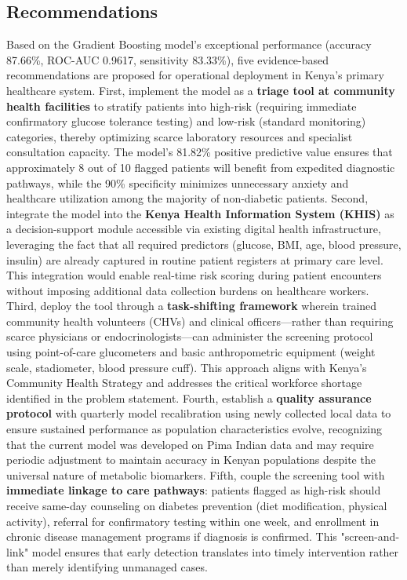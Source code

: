 \documentclass[12pt]{article}
\begin{document}
\subsection{Recommendations}

Based on the Gradient Boosting model's exceptional performance (accuracy 87.66\%, ROC-AUC 0.9617, sensitivity 83.33\%), five evidence-based recommendations are proposed for operational deployment in Kenya's primary healthcare system. First, implement the model as a \textbf{triage tool at community health facilities} to stratify patients into high-risk (requiring immediate confirmatory glucose tolerance testing) and low-risk (standard monitoring) categories, thereby optimizing scarce laboratory resources and specialist consultation capacity. The model's 81.82\% positive predictive value ensures that approximately 8 out of 10 flagged patients will benefit from expedited diagnostic pathways, while the 90\% specificity minimizes unnecessary anxiety and healthcare utilization among the majority of non-diabetic patients. Second, integrate the model into the \textbf{Kenya Health Information System (KHIS)} as a decision-support module accessible via existing digital health infrastructure, leveraging the fact that all required predictors (glucose, BMI, age, blood pressure, insulin) are already captured in routine patient registers at primary care level. This integration would enable real-time risk scoring during patient encounters without imposing additional data collection burdens on healthcare workers. Third, deploy the tool through a \textbf{task-shifting framework} wherein trained community health volunteers (CHVs) and clinical officers—rather than requiring scarce physicians or endocrinologists—can administer the screening protocol using point-of-care glucometers and basic anthropometric equipment (weight scale, stadiometer, blood pressure cuff). This approach aligns with Kenya's Community Health Strategy and addresses the critical workforce shortage identified in the problem statement. Fourth, establish a \textbf{quality assurance protocol} with quarterly model recalibration using newly collected local data to ensure sustained performance as population characteristics evolve, recognizing that the current model was developed on Pima Indian data and may require periodic adjustment to maintain accuracy in Kenyan populations despite the universal nature of metabolic biomarkers. Fifth, couple the screening tool with \textbf{immediate linkage to care pathways}: patients flagged as high-risk should receive same-day counseling on diabetes prevention (diet modification, physical activity), referral for confirmatory testing within one week, and enrollment in chronic disease management programs if diagnosis is confirmed. This "screen-and-link" model ensures that early detection translates into timely intervention rather than merely identifying unmanaged cases.
\end{document}
